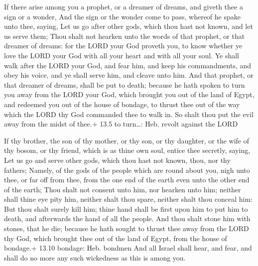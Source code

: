  If there arise among you a prophet, or a dreamer of dreams,
and giveth thee a sign or a wonder,  And the sign or the
wonder come to pass, whereof he spake unto thee, saying, Let us go after
other gods, which thou hast not known, and let us serve them;
 Thou shalt not hearken unto the words of that prophet, or
that dreamer of dreams: for the LORD your God proveth you, to know
whether ye love the LORD your God with all your heart and with all your
soul.  Ye shall walk after the LORD your God, and fear him,
and keep his commandments, and obey his voice, and ye shall serve him,
and cleave unto him.  And that prophet, or that dreamer of
dreams, shall be put to death; because he hath spoken to turn you away
from the LORD your God, which brought you out of the land of Egypt, and
redeemed you out of the house of bondage, to thrust thee out of the way
which the LORD thy God commanded thee to walk in. So shalt thou put the
evil away from the midst of thee.+ 13.5 to turn\ldots: Heb. revolt
against the LORD

 If thy brother, the son of thy mother, or thy son, or thy
daughter, or the wife of thy bosom, or thy friend, which is as thine own
soul, entice thee secretly, saying, Let us go and serve other gods,
which thou hast not known, thou, nor thy fathers;  Namely,
of the gods of the people which are round about you, nigh unto thee, or
far off from thee, from the one end of the earth even unto the other end
of the earth;  Thou shalt not consent unto him, nor hearken
unto him; neither shall thine eye pity him, neither shalt thou spare,
neither shalt thou conceal him:  But thou shalt surely kill
him; thine hand shall be first upon him to put him to death, and
afterwards the hand of all the people.  And thou shalt
stone him with stones, that he die; because he hath sought to thrust
thee away from the LORD thy God, which brought thee out of the land of
Egypt, from the house of bondage.+ 13.10 bondage: Heb. bondmen
 And all Israel shall hear, and fear, and shall do no more
any such wickedness as this is among you.

